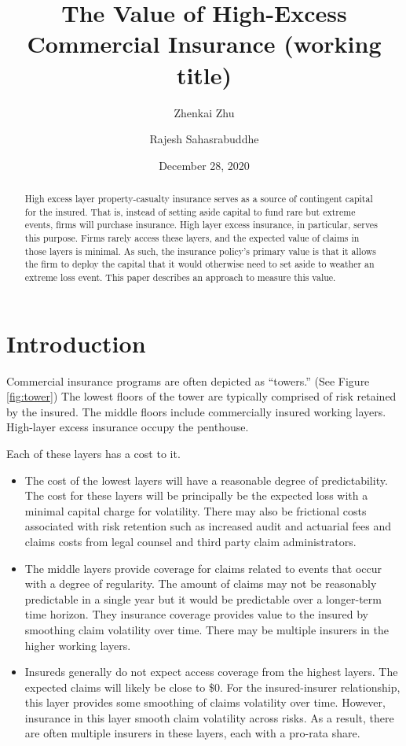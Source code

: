 \documentclass[
]{article}
\title{The Value of High-Excess Commercial Insurance (working title)}
\author{Zhenkai Zhu \and Rajesh Sahasrabuddhe}
\date{December 28, 2020}
\providecommand{\tightlist}{%
  \setlength{\itemsep}{0pt}\setlength{\parskip}{0pt}}
\begin{document}
\maketitle
\begin{abstract}
High excess layer property-casualty insurance serves as a source of
contingent capital for the insured. That is, instead of setting aside
capital to fund rare but extreme events, firms will purchase insurance.
High layer excess insurance, in particular, serves this purpose. Firms
rarely access these layers, and the expected value of claims in those
layers is minimal. As such, the insurance policy's primary value is that
it allows the firm to deploy the capital that it would otherwise need to
set aside to weather an extreme loss event. This paper describes an
approach to measure this value.
\end{abstract}

\hypertarget{introduction}{%
\section{Introduction}\label{introduction}}

Commercial insurance programs are often depicted as ``towers.'' (See
Figure \ref{fig:tower}) The lowest floors of the tower are typically
comprised of risk retained by the insured. The middle floors include
commercially insured working layers. High-layer excess insurance occupy
the penthouse.

Each of these layers has a cost to it.

\begin{itemize}
\tightlist
\item
  The cost of the lowest layers will have a reasonable degree of
  predictability. The cost for these layers will be principally be the
  expected loss with a minimal capital charge for volatility. There may
  also be frictional costs associated with risk retention such as
  increased audit and actuarial fees and claims costs from legal counsel
  and third party claim administrators.
\item
  The middle layers provide coverage for claims related to events that
  occur with a degree of regularity. The amount of claims may not be
  reasonably predictable in a single year but it would be predictable
  over a longer-term time horizon. They insurance coverage provides
  value to the insured by smoothing claim volatility over time. There
  may be multiple insurers in the higher working layers.
\item
  Insureds generally do not expect access coverage from the highest
  layers. The expected claims will likely be close to \$0. For the
  insured-insurer relationship, this layer provides some smoothing of
  claims volatility over time. However, insurance in this layer smooth
  claim volatility across risks. As a result, there are often multiple
  insurers in these layers, each with a pro-rata share.
\end{itemize}
\end{document}
